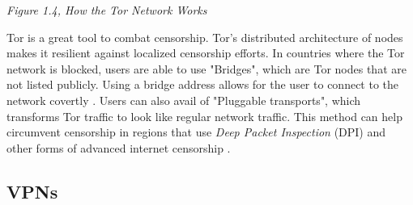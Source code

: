\centerline{\textit{Figure 1.4, How the Tor Network Works}}

Tor is a great tool to combat censorship. Tor's distributed architecture of nodes makes it resilient against localized censorship efforts. In countries where the Tor network is blocked, users are able to use "Bridges", which are Tor nodes that are not listed publicly. Using a bridge address allows for the user to connect to the network covertly \cite{torprojectBRIDGESProject}. Users can also avail of "Pluggable transports", which transforms Tor traffic to look like regular network traffic. This method can help circumvent censorship in regions that use \textit{Deep Packet Inspection} (DPI) and other forms of advanced internet censorship \cite{torprojectCIRCUMVENTIONProject}.

\subsection{VPNs}
